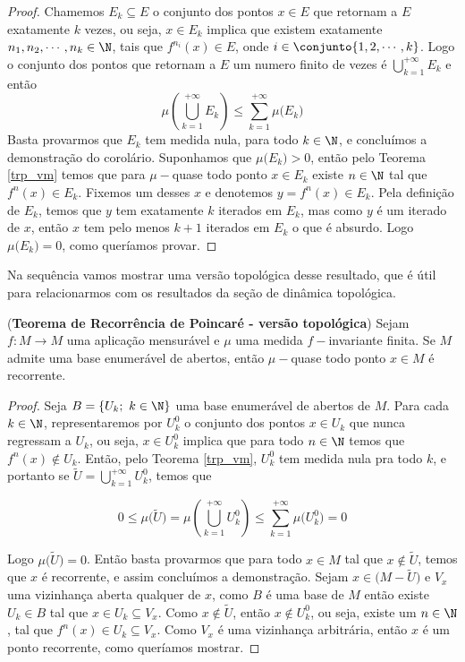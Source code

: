 \begin{proof} Chamemos $E_k\subseteq E$ o conjunto dos pontos $x\in E$ que retornam a $E$ exatamente $k$ vezes, ou seja, $x\in E_k$ implica que existem exatamente $n_1,n_2,\cdots,n_k\in\N$, tais que $f^{n_i}(x)\in E$, onde $i\in\conjunto{1,2,\cdots,k}$. Logo o conjunto dos pontos que retornam a $E$ um numero finito de vezes é $\bigcup_{k=1}^{+\infty}E_k$ e então
$$\mu\left(\bigcup_{k=1}^{+\infty}E_k\right)\leq\sum_{k=1}^{+\infty}\mu\big(E_k\big) $$\vspace{0.2cm}
Basta provarmos que $E_k$ tem medida nula, para todo $k\in\N$, e concluímos a demonstração do corolário. Suponhamos que $\mu\big(E_k\big)>0$, então pelo Teorema \ref{trp_vm} temos que para $\mu-$quase todo ponto $x\in E_k$ existe $n\in \N$ tal que $f^n(x)\in E_k$. Fixemos um desses $x$ e denotemos $y=f^n(x)\in E_k$. Pela definição de $E_k$, temos que $y$ tem exatamente $k$ iterados em $E_k$, mas como $y$ é um iterado de $x$, então $x$ tem pelo menos $k+1$ iterados em $E_k$ o que é absurdo. Logo $\mu\big(E_k\big)=0$, como queríamos provar.
\end{proof}

Na sequência vamos mostrar uma versão topológica desse resultado, que é útil para relacionarmos com os resultados da seção de dinâmica topológica.

\begin{teorema}\label{trp_vt} (\textbf{Teorema de Recorrência de Poincaré - versão topológica}) Sejam $f:M \to M$ uma aplicação mensurável e $\mu$ uma medida $f-$invariante finita. Se $M$ admite uma base enumerável de abertos, então $\mu-$quase todo ponto $x\in M$ é recorrente.
\end{teorema}

\begin{proof}
Seja $B=\{U_k;\ k\in\N\}$ uma base enumerável de abertos de $M$. Para cada $k\in\N$, representaremos por $U_{k}^{0}$ o conjunto dos pontos $x\in U_k$ que nunca regressam a $U_k$, ou seja, $x\in U_{k}^{0}$ implica que para todo $n\in\N$ temos que $f^n(x)\notin U_k$. Então, pelo Teorema \ref{trp_vm}, $U_{k}^{0}$ tem medida nula pra todo $k$, e portanto se $\tilde{U}=\bigcup_{k=1}^{+\infty}{U_{k}^{0}}$, temos que

\begin{equation*}
0\leq\mu\big(\tilde{U}\big)=\mu\left(\bigcup_{k=1}^{+\infty}{U_{k}^{0}}\right)\leq\sum_{k=1}^{+\infty}\mu\big(U_{k}^{0}\big)=0
\end{equation*}\vspace{0.1cm}

Logo $\mu\big(\tilde{U}\big)=0$. Então basta provarmos que para todo $x\in M$ tal que $x\notin \tilde{U}$, temos que $x$ é recorrente, e assim concluímos a demonstração. Sejam $x\in\big(M-\tilde{U}\big)$ e $V_x$ uma vizinhança aberta qualquer de $x$, como $B$ é uma base de $M$ então existe $U_k\in B$ tal que $x\in U_k\subseteq V_x$. Como $x\notin \tilde{U}$, então $x\notin U_{k}^{0}$, ou seja, existe um $n\in\N$, tal que $f^n(x)\in U_k\subseteq V_x$. Como $V_x$ é uma vizinhança arbitrária, então $x$ é um ponto recorrente, como queríamos mostrar.
\end{proof}

